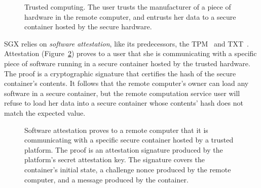 \begin{figure}[hbt]
  \caption{
    Trusted computing. The user trusts the manufacturer of a piece of hardware
    in the remote computer, and entrusts her data to a secure container hosted
    by the secure hardware.
  }
  \label{fig:trusted_computing}
\end{figure}

SGX relies on \textit{software attestation}, like its predecessors, the
TPM~\cite{grawrock2003tpm} and TXT~\cite{grawrock2009txt}. Attestation
(Figure~\ref{fig:generic_attestation}) proves to a user that she is
communicating with a specific piece of software running in a secure container
hosted by the trusted hardware. The proof is a cryptographic signature that
certifies the hash of the secure container's contents. It follows that the
remote computer's owner can load any software in a secure container, but the
remote computation service user will refuse to load her data into a secure
container whose contents' hash does not match the expected value.

\begin{figure}[hbt]
  \caption{
    Software attestation proves to a remote computer that it is communicating
    with a specific secure container hosted by a trusted platform. The proof is
    an attestation signature produced by the platform's secret attestation key.
    The signature covers the container's initial state, a challenge nonce
    produced by the remote computer, and a message produced by the container.
  }
  \label{fig:generic_attestation}
\end{figure}

